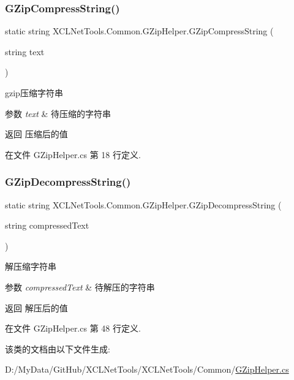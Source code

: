 \subsubsection{\texorpdfstring{G\+Zip\+Compress\+String()}{GZipCompressString()}}
{\footnotesize\ttfamily static string X\+C\+L\+Net\+Tools.\+Common.\+G\+Zip\+Helper.\+G\+Zip\+Compress\+String (\begin{DoxyParamCaption}\item[{string}]{text }\end{DoxyParamCaption})\hspace{0.3cm}{\ttfamily [static]}}



gzip压缩字符串 


\begin{DoxyParams}{参数}
{\em text} & 待压缩的字符串\\
\hline
\end{DoxyParams}
\begin{DoxyReturn}{返回}
压缩后的值
\end{DoxyReturn}


在文件 G\+Zip\+Helper.\+cs 第 18 行定义.

\mbox{\label{class_x_c_l_net_tools_1_1_common_1_1_g_zip_helper_a1bc9a866216b7c947e6c4aea6c8fef3d}} 
\subsubsection{\texorpdfstring{G\+Zip\+Decompress\+String()}{GZipDecompressString()}}
{\footnotesize\ttfamily static string X\+C\+L\+Net\+Tools.\+Common.\+G\+Zip\+Helper.\+G\+Zip\+Decompress\+String (\begin{DoxyParamCaption}\item[{string}]{compressed\+Text }\end{DoxyParamCaption})\hspace{0.3cm}{\ttfamily [static]}}



解压缩字符串 


\begin{DoxyParams}{参数}
{\em compressed\+Text} & 待解压的字符串\\
\hline
\end{DoxyParams}
\begin{DoxyReturn}{返回}
解压后的值
\end{DoxyReturn}


在文件 G\+Zip\+Helper.\+cs 第 48 行定义.



该类的文档由以下文件生成\+:\begin{DoxyCompactItemize}
\item 
D\+:/\+My\+Data/\+Git\+Hub/\+X\+C\+L\+Net\+Tools/\+X\+C\+L\+Net\+Tools/\+Common/\hyperlink{_g_zip_helper_8cs}{G\+Zip\+Helper.\+cs}\end{DoxyCompactItemize}
